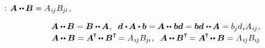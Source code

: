 :
${\bm{A} \dotdotp \hspace{-0.1ex} \bm{B} = A_{\hspace{.1ex}i\hspace{-0.1ex}j} B_{\hspace{-0.1ex}j\hspace{-0.06ex}i}}$,
 

\nopagebreak\vspace{-0.1em}\begin{equation}
\begin{array}{c}
\bm{A} \dotdotp \hspace{-0.1ex} \bm{B} = \bm{B} \dotdotp \hspace{-0.1ex} \bm{A}
\hspace{.12ex} ,
\;\;
\bm{d} \hspace{.1ex} \dotp \hspace{-0.15ex} \bm{A} \dotp \bm{b} = \hspace{-0.1ex} \bm{A} \dotdotp \hspace{.1ex} \bm{b}\bm{d} = \bm{b}\bm{d} \hspace{.1ex} \dotdotp \hspace{-0.1ex} \bm{A} = b_{\hspace{-0.1ex}j} d_{\hspace{.1ex}i} A_{\hspace{.1ex}i\hspace{-0.1ex}j} \hspace{.12ex} ,
\\[.2em]
%
\bm{A} \dotdotp \bm{B} = \bm{A}^{\hspace{-0.16ex}\T} \hspace{-0.2ex} \dotdotp \bm{B}^{\T} \hspace{-0.2ex} = A_{\hspace{.1ex}i\hspace{-0.1ex}j} B_{\hspace{-0.1ex}j\hspace{-0.06ex}i}
\hspace{.12ex} ,
\;\;
\bm{A} \dotdotp \bm{B}^{\T} \hspace{-0.2ex} = \bm{A}^{\hspace{-0.16ex}\T} \hspace{-0.2ex} \dotdotp \bm{B} = A_{\hspace{.1ex}i\hspace{-0.1ex}j} B_{i\hspace{-0.1ex}j}

\end{array}
\end{equation}
